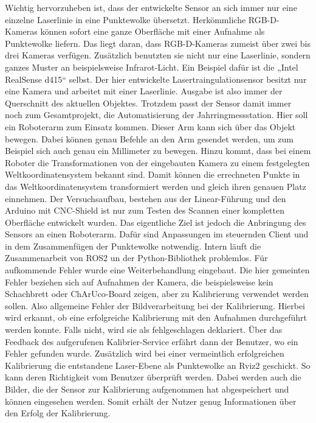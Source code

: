 	Wichtig hervorzuheben ist, dass der entwickelte Sensor an sich immer nur eine einzelne Laserlinie in eine Punktewolke übersetzt. Herkömmliche RGB-D-Kameras können sofort eine ganze Oberfläche mit einer Aufnahme als Punktewolke liefern. Das liegt daran, dass RGB-D-Kameras zumeist über zwei bis drei Kameras verfügen. Zusätzlich benutzten sie nicht nur eine Laserlinie, sondern ganzes Muster an beispielsweise Infrarot-Licht. Ein Beispiel dafür ist die „Intel RealSense d415“ selbst. Der hier entwickelte Lasertraingulationsensor besitzt nur eine Kamera und arbeitet mit einer Laserlinie. Ausgabe ist also immer der Querschnitt des aktuellen Objektes. Trotzdem passt der Sensor damit immer noch zum Gesamtprojekt, die Automatisierung der Jahrringmessstation. Hier soll ein Roboterarm zum Einsatz kommen. Dieser Arm kann sich über das Objekt bewegen. Dabei können genau Befehle an den Arm gesendet werden, um zum Beispiel sich auch genau ein Millimeter zu bewegen. Hinzu kommt, dass bei einem Roboter die Transformationen von der eingebauten Kamera zu einem festgelegten Weltkoordinatensystem bekannt sind. Damit können die errechneten Punkte in das Weltkoordinatensystem transformiert werden und gleich ihren genauen Platz einnehmen. Der Versuchsaufbau, bestehen aus der Linear-Führung und den Arduino mit CNC-Shield ist nur zum Testen des Scannen einer kompletten Oberfläche entwickelt wurden. Das eigentliche Ziel ist jedoch die Anbringung des Sensors an einen Roboterarm. Dafür sind Anpassungen im steuernden Client und in dem Zusammenfügen der Punktewolke notwendig. \newline
	Intern läuft die Zusammenarbeit von ROS2 un der Python-Bibliothek problemlos. Für aufkommende Fehler wurde eine Weiterbehandlung eingebaut. Die hier gemeinten Fehler beziehen sich auf Aufnahmen der Kamera, die beispielsweise kein Schachbrett oder ChArUco-Board zeigen, aber zu Kalibrierung verwendet werden sollen. Also allgemeine Fehler der Bildverarbeitung bei der Kalibrierung. Hierbei wird erkannt, ob eine erfolgreiche Kalibrierung mit den Aufnahmen durchgeführt werden konnte. Falls nicht, wird sie als fehlgeschlagen deklariert. Über das Feedback des aufgerufenen Kalibrier-Service erfährt dann der Benutzer, wo ein Fehler gefunden wurde. Zusätzlich wird bei einer vermeintlich erfolgreichen Kalibrierung die entstandene Laser-Ebene als Punktewolke an Rviz2 geschickt. So kann deren Richtigkeit vom Benutzer überprüft werden. Dabei werden auch die Bilder, die der Sensor zur Kalibrierung aufgenommen hat abgespeichert und können eingesehen werden. Somit erhält der Nutzer genug Informationen über den Erfolg der Kalibrierung. 
